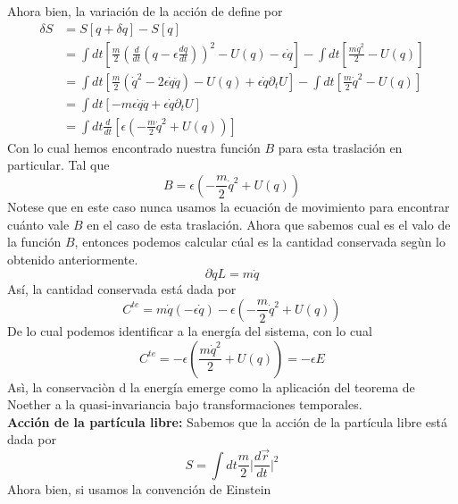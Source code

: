 \documentclass[../main.tex]{subfiles}
\begin{document}
Ahora bien, la variación de la acción de define por
\begin{align}
    \delta S  & = S[ q + \delta q] - S[q]  \\
   & = \int dt \left[ \frac{m}{2} \left(\frac{d}{dt}\left( q - \epsilon \frac{dq}{dt} \right) \right)^2  - U(q)  - \epsilon \dot{q}\right] - \int dt \left[ \frac{m\dot{q}^2}{2} - U(q) \right] \\
   & = \int dt \left[  \frac{m}{2} (\dot{q}^2 - 2 \epsilon \dot{q}\ddot{q}) - U(q) + \epsilon \dot{q} \partial_tU\right] - \int dt \left[  \frac{m}{2} \dot{q}^2- U(q)\right] \\
   & = \int dt \left[ -m\epsilon \dot{q}\ddot{q} +\epsilon \dot{q} \partial_tU\right] \\
   & = \int dt \frac{d}{dt} \left[   \epsilon \left(  -\frac{m}{2} \dot{q}^2 + U(q)\right) \right]
\end{align}
Con lo cual hemos encontrado nuestra función $B$ para esta traslación en particular. Tal que
\begin{equation}
    B= \epsilon \left(  -\frac{m}{2} \dot{q}^2 + U(q)\right)
\end{equation}
Notese que en este caso nunca usamos la ecuación de movimiento para encontrar cuánto vale $B$ en el caso de esta traslación. Ahora que sabemos cual es el valo de la función $B$, entonces podemos calcular cúal es la cantidad conservada segùn lo obtenido anteriormente.
\begin{equation}
    \partial{\dot{q}}L= m\dot{q}
\end{equation}
Así, la cantidad conservada está dada por 
\begin{equation}
    C^{te}= m\dot{q} (-\epsilon \dot{q} ) - \epsilon \left(  -\frac{m}{2} \dot{q}^2 + U(q)\right)
\end{equation}
De lo cual podemos identificar a la energía del sistema, con lo cual
\begin{equation}
    C^{te}=-\epsilon \left( \frac{m\dot{q}^2}{2}  + U(q)\right) = -\epsilon E
\end{equation}
Asì, la conservaciòn d la energía emerge como la aplicación del teorema de Noether a la quasi-invariancia bajo transformaciones temporales. \\
\textbf{Acción de la partícula libre:} Sabemos que la acción de la partícula libre está dada por 
\begin{equation}
    S = \int dt \frac{m}{2} \big| \frac{d\vec{r}}{dt} \big| ^2 
\end{equation}
Ahora bien, si usamos la convención de Einstein
\end{document}
